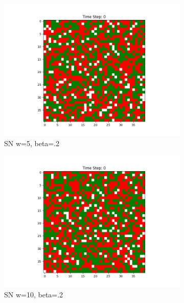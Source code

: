 \documentclass[11pt]{article}
\begin{document}
\begin{figure}[h]
\begin{subfigure}{0.14\textwidth}
			\includegraphics[width=\linewidth]{initial_cluster_w5b20.png}
			\caption{\centering SN w=5, beta=.2}
		\end{subfigure}\hfill
		\begin{subfigure}{0.14\textwidth}
			\includegraphics[width=\linewidth]{initial_cluster_w10b20.png}
			\caption{\centering SN w=10, beta=.2}
		\end{subfigure}\hfill
		\begin{subfigure}{0.14\textwidth}

\end{subfigure}
\end{figure}
\end{document}
